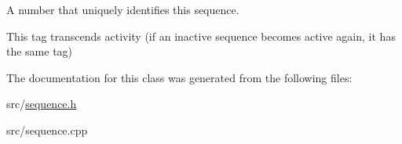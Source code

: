 A number that uniquely identifies this sequence. 

This tag transcends activity (if an inactive sequence becomes active again, it has the same tag) 

The documentation for this class was generated from the following files\+:\begin{DoxyCompactItemize}
\item 
src/\hyperlink{sequence_8h}{sequence.\+h}\item 
src/sequence.\+cpp\end{DoxyCompactItemize}
